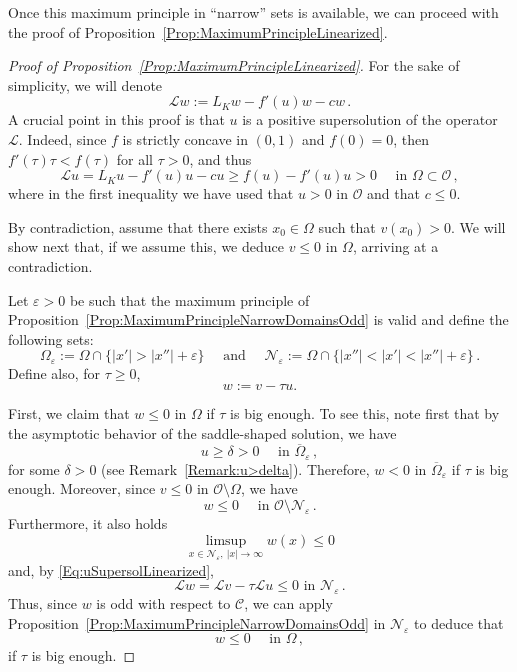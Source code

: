 \documentclass[12pt,reqno]{amsart}
\theoremstyle{definition}
\theoremstyle{remark}
\newcommand{\ccal}{\mathscr{C}}
\newcommand{\ncal}{\mathcal{N}}
\newcommand{\ocal}{\mathcal{O}}
\numberwithin{equation}{section}
\begin{document}
Once this maximum principle in ``narrow'' sets is available, we can proceed with the proof of Proposition~\ref{Prop:MaximumPrincipleLinearized}.

\begin{proof}[Proof of Proposition~\ref{Prop:MaximumPrincipleLinearized}]
	
	
	
	For the sake of simplicity, we will denote 
	$$
	\mathscr{L} w := L_K w - f'(u)w - cw\,.
	$$
	A crucial point in this proof is that $u$ is a positive supersolution of the operator $\mathscr{L}$. Indeed, since $f$ is strictly concave in $(0,1)$ and $f(0)=0$, then $f'(\tau)\tau<f(\tau)$ for all $\tau>0$, and thus 
	\begin{equation}
	\label{Eq:uSupersolLinearized}
	\mathscr{L} u = L_K u - f'(u)u - cu \geq f(u) - f'(u)u > 0 \quad \textrm{ in } \Omega \subset \ocal\,,
	\end{equation}
	where in the first inequality we have used that $u>0$ in $\ocal$ and that $c\leq 0$.
	
	
	
	
	By contradiction, assume that there exists $x_0\in \Omega$ such that $v(x_0)> 0$. We will show next that, if we assume this, we deduce $v\leq 0$ in $\Omega$, arriving at a contradiction.
	
	
	
	
	Let $\varepsilon > 0$ be such that the maximum principle of Proposition~\ref{Prop:MaximumPrincipleNarrowDomainsOdd} is valid and define the following sets:
	$$
	\Omega_\varepsilon := \Omega \cap \{|x'| > |x''| + \varepsilon\}\quad \textrm{ and } \quad 
	\ncal_\varepsilon := \Omega \cap \{|x''| < |x'| < |x''| + \varepsilon\}\,.
	$$
	Define also, for $\tau \geq 0$, 
	$$
	w := v - \tau u.
	$$
	
	First, we claim that $w\leq 0$ in $\Omega$ if $\tau$ is big enough. To see this, note first that by the asymptotic behavior of the saddle-shaped solution, we have 
	\begin{equation}
	\label{Eq:u>delta}
	u \geq \delta > 0 \quad \textrm{ in } \overline{\Omega}_\varepsilon\,,
	\end{equation}
	for some $\delta >0$ (see Remark~\ref{Remark:u>delta}). Therefore, $w < 0$ in $\overline{\Omega}_\varepsilon$ if $\tau$ is big enough. Moreover, since $v\leq 0$ in $\ocal\setminus\Omega$, we have 
	$$
	w \leq 0 \quad \textrm{ in } \ocal \setminus \ncal_\varepsilon\,.
	$$
	Furthermore, it also holds
	$$
	\limsup_{x\in \ncal_\varepsilon, \ |x|\to \infty} w(x) \leq 0
	$$
	and, by \eqref{Eq:uSupersolLinearized},
	$$
	\mathscr{L} w = \mathscr{L} v - \tau \mathscr{L} u \leq 0 \textrm{ in } \ncal_\varepsilon\,.
	$$
	Thus, since $w$ is odd with respect to $\ccal$, we can apply Proposition~\ref{Prop:MaximumPrincipleNarrowDomainsOdd} in $\ncal_\varepsilon$ to deduce that
	$$
	w \leq 0 \quad \textrm{ in } \Omega\,,
	$$
	if $\tau$ is big enough.
	

\end{proof}
\end{document}
